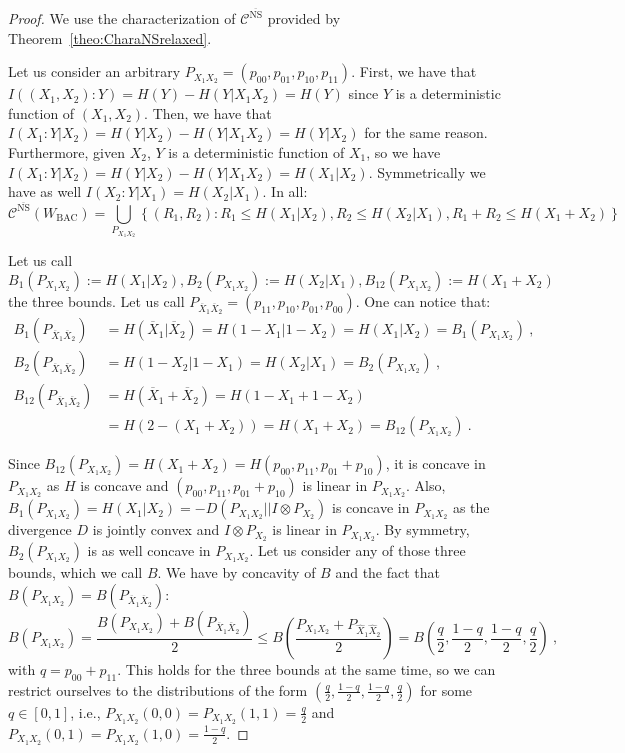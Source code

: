 \documentclass[11pt]{article}
\theoremstyle{definition}
\theoremstyle{remark}
\begin{document}
  \begin{proof}
    We use the characterization of $\mathcal{C}^{\overline{\mathrm{NS}}}$ provided by Theorem~\ref{theo:CharaNSrelaxed}.

    Let us consider an arbitrary $P_{X_1X_2}=(p_{00},p_{01},p_{10},p_{11})$. First, we have that $I((X_1,X_2):Y) = H(Y) - H(Y|X_1X_2) = H(Y)$ since $Y$ is a deterministic function of $(X_1,X_2)$. Then, we have that $I(X_1:Y|X_2) = H(Y|X_2) - H(Y|X_1X_2) = H(Y|X_2)$ for the same  reason. Furthermore, given $X_2$, $Y$  is a deterministic function of $X_1$, so we have $I(X_1:Y|X_2) = H(Y|X_2) - H(Y|X_1X_2) = H(X_1|X_2)$. Symmetrically we have as well $I(X_2:Y|X_1) = H(X_2|X_1)$. In all:
    \[ \mathcal{C}^{\overline{\mathrm{NS}}}(W_{\text{BAC}}) =  \bigcup_{P_{X_1X_2}}\left\{ (R_1,R_2) : R_1 \leq H(X_1|X_2), R_2 \leq H(X_2|X_1), R_1+R_2 \leq H(X_1+X_2)\right\} \]
    
    Let us call $B_1(P_{X_1X_2}):=H(X_1|X_2),B_2(P_{X_1X_2}):=H(X_2|X_1),B_{12}(P_{X_1X_2}):=H(X_1+X_2)$ the three bounds. Let us call $P_{\overline{X}_1\overline{X}_2}=(p_{11},p_{10},p_{01},p_{00})$. One can notice that:
    \begin{equation}
      \begin{aligned}
        B_1(P_{\overline{X}_1\overline{X}_2}) &= H(\overline{X}_1|\overline{X}_2) = H(1-X_1|1-X_2) = H(X_1|X_2) = B_1(P_{X_1X_2}) \ ,\\
        B_2(P_{\overline{X}_1\overline{X}_2}) &= H(1-X_2|1-X_1) = H(X_2|X_1) = B_2(P_{X_1X_2}) \ ,\\
        B_{12}(P_{\overline{X}_1\overline{X}_2}) &= H(\overline{X}_1+\overline{X}_2) = H(1-X_1+1-X_2)\\
        &= H(2-(X_1+X_2))=H(X_1+X_2) = B_{12}(P_{X_1X_2}) \ .
      \end{aligned}
    \end{equation}   
    
    Since $B_{12}(P_{X_1X_2}) = H(X_1+X_2) = H(p_{00},p_{11},p_{01}+p_{10})$, it is concave in $P_{X_1X_2}$ as $H$ is concave and $(p_{00},p_{11},p_{01}+p_{10})$ is linear in $P_{X_1X_2}$. Also, $B_1(P_{X_1X_2}) = H(X_1|X_2) = -D(P_{X_1X_2} ||I \otimes P_{X_2})$ is concave in $P_{X_1X_2}$  as the divergence $D$ is jointly convex and $I \otimes P_{X_2}$ is linear in $P_{X_1X_2}$. By symmetry, $B_2(P_{X_1X_2})$ is as well concave in $P_{X_1X_2}$. Let us consider any of those three bounds, which we call $B$. We have by concavity of $B$ and the fact that $B(P_{X_1X_2})=B(P_{\overline{X}_1\overline{X}_2})$:
    \[B(P_{X_1X_2}) = \frac{B(P_{X_1X_2})+B(P_{\overline{X}_1\overline{X}_2})}{2} \leq B\left(\frac{P_{X_1X_2}+P_{\hat{X}_1\hat{X}_2}}{2}\right) = B\left(\frac{q}{2},\frac{1-q}{2},\frac{1-q}{2},\frac{q}{2}\right) \ , \]
    with $q=p_{00}+p_{11}$. This holds for the three bounds at the same time, so we can restrict ourselves to the distributions of the form $\left(\frac{q}{2},\frac{1-q}{2},\frac{1-q}{2},\frac{q}{2}\right)$ for some $q \in [0,1]$, i.e., $P_{X_1X_2}(0,0) = P_{X_1X_2}(1,1) = \frac{q}{2}$ and $P_{X_1X_2}(0,1) = P_{X_1X_2}(1,0) = \frac{1-q}{2}$.


\end{proof}
\end{document}
